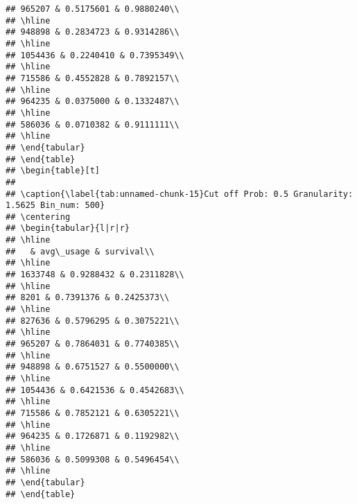 \documentclass[]{article}
\begin{document}
\begin{verbatim}
## 965207 & 0.5175601 & 0.9880240\\
## \hline
## 948898 & 0.2834723 & 0.9314286\\
## \hline
## 1054436 & 0.2240410 & 0.7395349\\
## \hline
## 715586 & 0.4552828 & 0.7892157\\
## \hline
## 964235 & 0.0375000 & 0.1332487\\
## \hline
## 586036 & 0.0710382 & 0.9111111\\
## \hline
## \end{tabular}
## \end{table}
## \begin{table}[t]
## 
## \caption{\label{tab:unnamed-chunk-15}Cut off Prob: 0.5 Granularity: 1.5625 Bin_num: 500}
## \centering
## \begin{tabular}{l|r|r}
## \hline
##   & avg\_usage & survival\\
## \hline
## 1633748 & 0.9288432 & 0.2311828\\
## \hline
## 8201 & 0.7391376 & 0.2425373\\
## \hline
## 827636 & 0.5796295 & 0.3075221\\
## \hline
## 965207 & 0.7864031 & 0.7740385\\
## \hline
## 948898 & 0.6751527 & 0.5500000\\
## \hline
## 1054436 & 0.6421536 & 0.4542683\\
## \hline
## 715586 & 0.7852121 & 0.6305221\\
## \hline
## 964235 & 0.1726871 & 0.1192982\\
## \hline
## 586036 & 0.5099308 & 0.5496454\\
## \hline
## \end{tabular}
## \end{table}
\end{verbatim}
\end{document}
